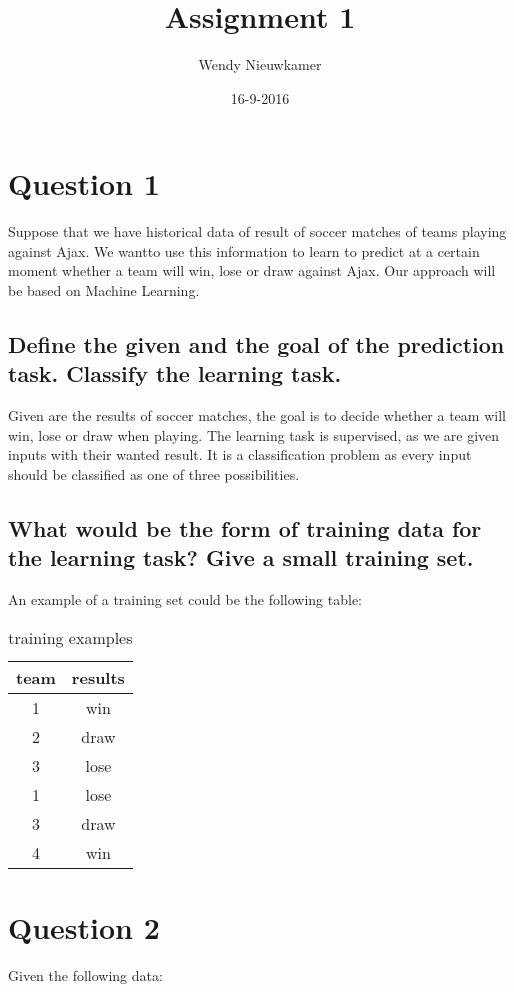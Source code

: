 \documentclass[12pt, a4paper]{article}
\title {Assignment 1}
\date{16-9-2016}
\author{Wendy Nieuwkamer}
\begin{document}
\maketitle

\section{Question 1}
Suppose that we have historical data of result of soccer matches of teams playing against Ajax. We wantto
use this information to learn to predict at a certain moment whether a team will win, lose or draw against
Ajax. Our approach will be based on Machine Learning.

\subsection{Define the given and the goal of the prediction task.
Classify the learning task.}

Given are the results of soccer matches, the goal is to decide whether a team will win, lose or draw when playing. 
The learning task is supervised, as we are given inputs with their wanted result. It is a classification problem as 
every input should be classified as one of three possibilities.


\subsection{What would be the form of training data for the learning task? Give a small training set.}
An example of a training set could be the following table:

\begin{table}
\centering
\begin{tabular}{c|c}
   team & results \\
   \hline
   1 & win\\
   2 & draw\\
   3 & lose\\
   1 & lose\\ 
   3 & draw\\
   4 & win\\
\end{tabular}
\caption{training examples}
\end{table}

\section{Question 2}
Given the following data: 
\end{document}
